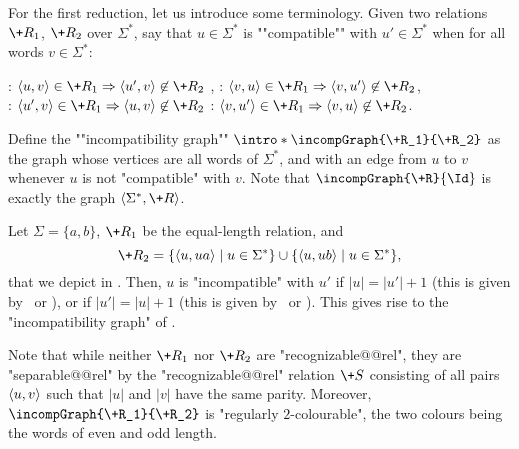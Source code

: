 \AP For the first reduction, let us introduce some terminology.
Given two relations $\+R_1$, $\+R_2$ over $\Sigma^*$, say that
$u \in \Sigma^*$ is ""compatible"" with
$u' \in \Sigma^*$ when for all words $v \in \Sigma^*$:
\begin{center}
    \intro*\compL: $\tup{u,v} \in \+R_1 \Rightarrow \tup{u',v} \not\in \+R_2$%
    ,\hphantom{\text{ \fancyand }}
    \intro*\compR: $\tup{v,u} \in \+R_1 \Rightarrow \tup{v,u'} \not\in \+R_2$,\\
    \intro*\compLpr: $\tup{u',v} \in \+R_1 \Rightarrow \tup{u,v} \not\in \+R_2$%
    \hphantom{,}\text{ \fancyand }
    \intro*\compRpr: $\tup{v,u'} \in \+R_1 \Rightarrow \tup{v,u} \not\in \+R_2$.
\end{center}
\AP
Define the ""incompatibility graph"" $\intro*\incompGraph{\+R_1}{\+R_2}$
as the graph whose vertices are all words of $\Sigma^*$,
and with an edge from $u$ to $v$ whenever $u$ is not "compatible" with $v$.
Note that $\incompGraph{\+R}{\Id}$ is exactly the graph $\tup{\Sigma^*,\+R}$.

\begin{example}%
    \AP\label{ex:equal-length-plusone}%
    Let $\Sigma = \{a,b\}$, $\+R_1$ be the equal-length relation,
    and
    \[
        \+R_2 = \{\tup{u, ua} \mid u \in \Sigma^*\} \cup \{\tup{u, ub} \mid u \in \Sigma^*\},
    \]
    that we depict in .
    Then, $u$ is "incompatible" with $u'$ if $|u| = |u'|+1$ (this is given by \compL~or \compR),
    or if $|u'| = |u|+1$ (this is given by \compLpr~or \compRpr).
    This gives rise to the "incompatibility graph" of
    .
    \begin{marginfigure}[-8em]%
        \centering
        \begin{tikzpicture}
            
        \end{tikzpicture}
        \caption{\AP\label{fig:equal-length-plusone-relation}%
            The relation $\+R_2$ of ,
            restricted to words of length at most 2.
        }
    \end{marginfigure}%
    \begin{marginfigure}%
        \centering
        \begin{tikzpicture}
            
        \end{tikzpicture}
        \caption{\AP\label{fig:equal-length-plusone-incompatibility}%
            "Incompatibility graph" $\incompGraph{\+R_1}{\+R_2}$ and its "regular $2$-colouring".%
        }
    \end{marginfigure}%

    Note that while neither $\+R_1$ nor $\+R_2$ are "recognizable@@rel",
    they are "separable@@rel" by the "recognizable@@rel" relation
    $\+S$ consisting of all pairs $\tup{u,v}$ such that $|u|$ and $|v|$ have the same parity.
    Moreover, $\incompGraph{\+R_1}{\+R_2}$ is "regularly $2$-colourable", the two colours being
    the words of even and odd length.
\end{example}

